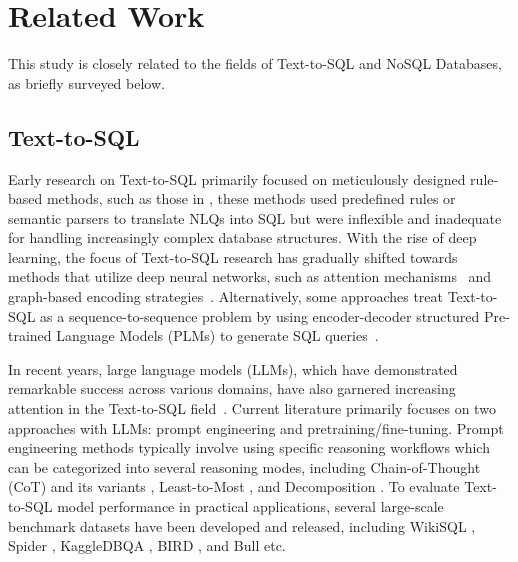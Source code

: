 \section{Related Work}
This study is closely related to the fields of Text-to-SQL and NoSQL Databases, as briefly surveyed below.
\subsection{Text-to-SQL}
Early research on Text-to-SQL primarily focused on meticulously designed rule-based methods, such as those in \citep{baik2020duoquest,li2014constructing,li2014nalir,quamar2022natural,sen2020athena++}, these methods used predefined rules or semantic parsers to translate NLQs into SQL but were inflexible and inadequate for handling increasingly complex database structures.
%
With the rise of deep learning, the focus of Text-to-SQL research has gradually shifted towards methods that utilize deep neural networks, such as attention mechanisms~\citep{liu2023multi}  and graph-based encoding strategies~\citep{hui-etal-2022-s2sql,li2023graphix,qi-etal-2022-rasat,wang-etal-2020-rat,xu-etal-2018-sql,zheng-etal-2022-hie,yu2021grappa,xiang2023g3r}. Alternatively, some approaches treat Text-to-SQL as a sequence-to-sequence problem by using encoder-decoder structured Pre-trained Language Models (PLMs) to generate SQL queries~\citep{10.5555/3304222.3304323,popescu2022addressing,qi-etal-2022-rasat}.

In recent years, large language models (LLMs), which have demonstrated remarkable success across various domains, have also garnered increasing attention in the Text-to-SQL field~\citep{dong2023c3,gan-etal-2021-natural-sql,10.14778/3641204.3641221,li2023resdsql,lin-etal-2020-bridging,pourreza2024din,qi-etal-2022-rasat,rubin-berant-2021-smbop,scholak-etal-2021-picard}. Current literature primarily focuses on two approaches with LLMs: prompt engineering and pretraining/fine-tuning. Prompt engineering methods typically involve using specific reasoning workflows which can be categorized into several reasoning modes, including Chain-of-Thought (CoT) \citep{wei2022chain} and its variants \citep{pourreza2024din,liu2023divide,zhang-etal-2024-coe,zhang-etal-2023-act}, Least-to-Most \citep{zhou2023leasttomost,gan-etal-2021-natural-sql,arora-etal-2023-adapt}, and Decomposition \citep{khot2023decomposed,tai-etal-2023-exploring,pourreza2024din,wang-etal-2025-mac,xie-etal-2024-decomposition}. To evaluate Text-to-SQL model performance in practical applications, several large-scale benchmark datasets have been developed and released, including WikiSQL \citep{zhong2018seqsql}, Spider \citep{yu-etal-2018-spider}, KaggleDBQA \citep{lee-etal-2021-kaggledbqa}, BIRD \citep{10.5555/3666122.3667957}, and Bull \citep{10.1145/3626246.3653375} etc.

